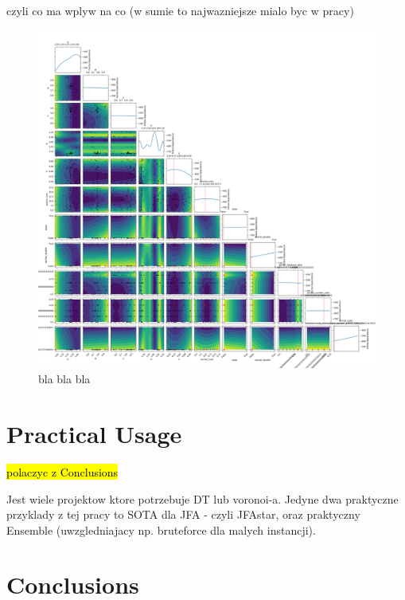 \documentclass[format=acmsmall,screen,review,authordraft,nonacm]{acmart}
\begin{document}
czyli co ma wplyw na co (w sumie to najwazniejsze mialo byc w pracy)

\begin{figure}[H]
	\centering
	\includegraphics[width=\linewidth]{../figures/raport}
	\caption{bla bla bla}
	\label{fig:abstract}
\end{figure}

\section{Practical Usage} %

\hl{polaczyc z Conclusions}

Jest wiele projektow ktore potrzebuje DT lub voronoi-a. Jedyne dwa praktyczne
przyklady z tej pracy to SOTA dla JFA - czyli JFAstar, oraz praktyczny Ensemble
(uwzgledniajacy np. bruteforce dla malych instancji).

\section{Conclusions} %
\end{document}
